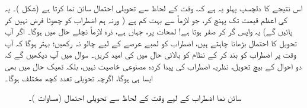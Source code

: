 اس نتیجے کا دلچسپ پہلو یہ ہے کہ، وقت کے لحاظ سے تحویلی احتمال سائن نما  کرتا ہے (شکل )۔
 یہ  کی اعظم قیمت تک پہنچ کر، جو لازماً  سے بہت کم ہے ( ورنہ ہم اضطراب کو چھوٹا فرض نہیں کر پائیں گے) یہ واپس گر کر صفر ہوتا ہے! لمحات  پر، جہاں  ہے، ذرہ لازماً نچلے حال میں ہوگا۔ اگر آپ تحویل کا احتمال بڑھانا چاہتے ہیں، اضطراب کو لمبے عرصے کے لیے چالو نہ رکھیں؛ بہتر ہوگا کہ آپ وقت  پر اضطراب کو بند کر کے نظام کو بالائی حال میں  کی امید کریں۔ سوال  میں آپ دیکھیں گے کہ دو احوال کے بیچ تحویل، نظریہ اضطراب کی پیدا کردہ مصنوعی خاصیت نہیں، بلکہ ٹھیک حال میں بھی ایسا ہی ہوگا، اگرچہ تحویلی تعدد کچھ مختلف ہوگا۔

\begin{figure}
\centering
{}
\caption{سائن نما اضطراب کے لیے وقت کے لحاظ سے تحویلی احتمال (مساوات )۔}
\label{شکل_تابع_وقت_احتمال_سائن_نما_احتمال}
\end{figure}


